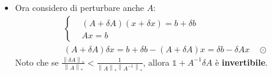 \documentclass{article}
\begin{document}
\begin{itemize}
          \begin{note}{Norma Indotta}{}
              Dato che
              \[\frac{\left\|Ax\right\|}{\left\|x\right\|}\le\sup_{y}\frac{\left\|Ay\right\|}{\left\|y\right\|}=\left\|A\right\|_*\quad \forall x\in\mathbb{R}^n\]
              Allora:
              \[\boxed{\left\|Ax\right\|\underset{\forall x\in\mathbb{R}^n}{\le}\left\|A\right\|_*\cdot\left\|x\right\|}\]
          \end{note}
          Su $\circledast$ sto misurando in termini assoluti, devo invece misurare in termini \underline{relativi} dividendo per $\left\|x\right\|$:
          \begin{align*}
               & \frac{\left\|\delta x\right\|}{\left\|x\right\|}\le \left\|A^{-1}\right\|_*\left\|\delta b\right\|\cdot\frac{1}{\left\|x\right\|}\ \text{\textcircled{$\vartriangle$}}\quad\text{Mi serve poter stimare da sopra $\left\|x\right\|\ge\dots$ qualcosa} \\
               & \circledast\ \left\|x\right\|\ge\frac{\left\|b\right\|}{\left\|A\right\|_*}\Leftarrow
              \begin{cases}
                   & Ax=b\Rightarrow \left\|Ax\right\|=\left\|b\right\|                        \\
                   & \left\|Ax\right\|\le\left\|A\right\|_*\left\|x\right\|\quad \text{Nota 1}
              \end{cases}                                                                                                                                                                             \\
               & \textcircled{$\vartriangle$}+\circledast\quad\frac{\left\|\delta x\right\|}{\left\|x\right\|}\le\left\|A^{-1}\right\|_*\left\|A\right\|_*\cdot\frac{\left\|\delta b\right\|}{\left\|b\right\|}\ \forall b\in\mathbb R^n                               \\
               & \text{Dove $\left\|A^{-1}\right\|_*\left\|A\right\|_*$ è l'indice di condizionamento globale del problema semplificato.}
          \end{align*}

    \item Ora considero di perturbare anche $A$:
          \begin{align*}
               & \begin{cases}
                      & (A+\delta A)(x+\delta x)=b+\delta b \\
                      & Ax=b
                 \end{cases}                                     \\
               & (A+\delta A)\delta x=b+\delta b-(A+\delta A)x=\delta b-\delta Ax\quad\odot
          \end{align*}
          Noto che se \(\frac{\left\|\delta A\right\|_*}{\left\|A\right\|_*}<\frac{1}{\left\|A\right\|_*\left\|A^{-1}\right\|_*}\), allora
          \(\mathbb 1+A^{-1}\delta A\) è \textbf{invertibile}.


\end{itemize}
\end{document}
